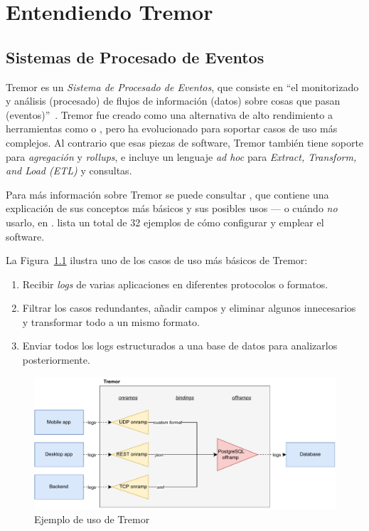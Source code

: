 
\chapter{Entendiendo Tremor}\label{ch:tremor}

\section{Sistemas de Procesado de Eventos}

Tremor es un \emph{Sistema de Procesado de Eventos}, que consiste en ``el
monitorizado y análisis (procesado) de flujos de información (datos) sobre cosas
que pasan (eventos)''~\cite{luckham2011event}. Tremor fue creado como una
alternativa de alto rendimiento a herramientas como \textcite{logstash} o
\textcite{telegraf}, pero ha evolucionado para soportar casos de uso más
complejos. Al contrario que esas piezas de software, Tremor también tiene
soporte para \emph{agregación} y \emph{rollups}, e incluye un lenguaje \emph{ad
hoc} para \emph{Extract, Transform, and Load (ETL)} y consultas.

Para más información sobre Tremor se puede consultar \textcite{tremorintro}, que
contiene una explicación de sus conceptos más básicos y sus posibles usos --- o
cuándo \emph{no} usarlo, en \textcite{tremorconstraints}.
\textcite{tremorrecipes} lista un total de 32 ejemplos de cómo configurar y
emplear el software.

La Figura~\ref{fig:tremor_example} ilustra uno de los casos de uso más básicos
de Tremor:

\begin{enumerate}
    \item Recibir \emph{logs} de varias aplicaciones en diferentes protocolos o
        formatos.
    \item Filtrar los casos redundantes, añadir campos y eliminar algunos
        innecesarios y transformar todo a un mismo formato.
    \item Enviar todos los logs estructurados a una base de datos para
        analizarlos posteriormente.
\end{enumerate}

\begin{figure}
    \centering
    \includegraphics[width=\textwidth]{./Imagenes/example.pdf}
    \caption{Ejemplo de uso de Tremor}%
    \label{fig:tremor_example}
\end{figure}

